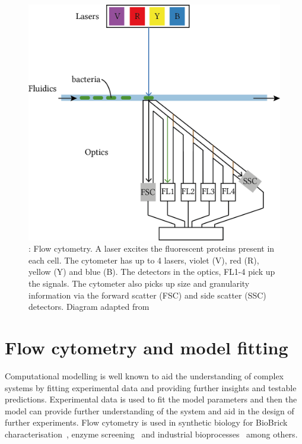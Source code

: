 \begin{figure}[tb]
	\begin{center}
		\includegraphics[scale=0.9]{../../chapters/chapterBackgr/images/flow-overview.png}
	\caption[LoF caption]{\label{fig:flow_overv}: Flow cytometry. A laser excites the fluorescent proteins present in each cell. The cytometer has up to 4 lasers, violet (V), red (R), yellow (Y) and blue (B). The detectors in the optics, FL1-4 pick up the signals. The cytometer also picks up size and granularity information via the forward scatter (FSC) and side scatter (SSC) detectors. Diagram adapted from~\autocite{FlowDiagram}}
	\end{center}
\end{figure}


\section{Flow cytometry and model fitting}

Computational modelling is well known to aid the understanding  of complex systems by fitting experimental data and providing further insights and testable predictions. Experimental data is used to fit the model parameters and then the model can provide further understanding of the system and aid in the design of further experiments. Flow cytometry is used in synthetic biology for BioBrick characterisation~\autocite{Kelly:2009bj}, enzyme screening~\autocite{Choi:2014gb} and industrial  bioprocesses~\autocite{Diaz:2010kw} among others. 

